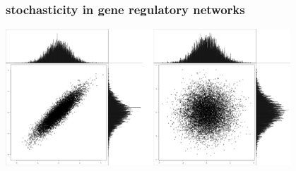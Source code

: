 \begin{frame}
\vspace{1em}
\frametitle{stochasticity in gene regulatory networks}
\begin{center}
\includegraphics[width=0.8\textwidth]{fig/mvnormaltwo.pdf}\\
\end{center}
\end{frame}

